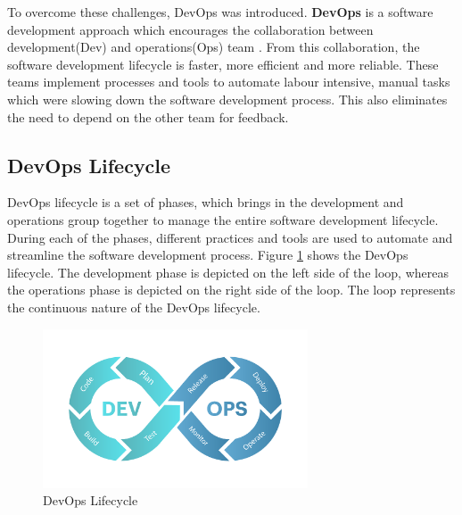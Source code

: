 To overcome these challenges, DevOps was introduced. \textbf{DevOps} is a software development approach which encourages the collaboration between development(Dev) 
and operations(Ops) team \cite{10616918}. From this collaboration, the software development lifecycle is faster, more efficient and more reliable. These teams 
implement processes and tools to automate labour intensive, manual tasks which were slowing down the software development process. This also eliminates the 
need to depend on the other team for feedback. 


\subsection{DevOps Lifecycle}
DevOps lifecycle is a set of phases, which brings in the development and operations group together to manage the entire software development lifecycle.
During each of the phases, different practices and tools are used to automate and streamline the software development process. Figure \ref{devops_lifecycle} shows 
the DevOps lifecycle. The development phase is depicted on the left side of the loop, whereas the operations phase is depicted on the right side of the loop. 
The loop represents the continuous nature of the DevOps lifecycle.
\begin{figure}[!ht]
    \centering
    \includegraphics[width=0.7\textwidth]{Images/DevOps-Life-Cycle.pdf}
    \caption{DevOps Lifecycle \cite{devops_lifecycle}}
    \label{devops_lifecycle}
\end{figure}

